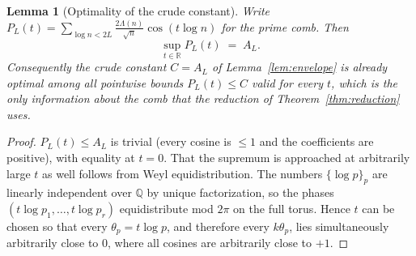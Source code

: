 ﻿\documentclass[11pt]{article}
\newtheorem{lemma}[theorem]{Lemma}
\newcommand{\R}{\mathbb{R}}
\begin{document}
\begin{lemma}[Optimality of the crude constant]\label{lem:sharp}
Write $P_L(t)=\sum_{\log n<2L}\frac{2\Lambda(n)}{\sqrt n}\cos(t\log n)$
for the prime comb.  Then
\[
\sup_{t\in\R}P_L(t)\;=\;A_L .
\]
Consequently the crude constant $C=A_L$ of Lemma~\ref{lem:envelope} is
already optimal among all pointwise bounds $P_L(t)\le C$ valid for
every $t$, which is the only information about the comb that the
reduction of Theorem~\ref{thm:reduction} uses.
\end{lemma}

\begin{proof}
$P_L(t)\le A_L$ is trivial (every cosine is $\le1$ and the
coefficients are positive), with equality at $t=0$.  That the supremum
is approached at arbitrarily large $t$ as well follows from Weyl
equidistribution.  The numbers $\{\log p\}_p$ are linearly independent
over $\mathbb Q$ by unique factorization, so the phases
$(t\log p_1,\dots,t\log p_r)$ equidistribute mod $2\pi$ on the full
torus.  Hence $t$ can be chosen so that every $\theta_p=t\log p$, and
therefore every $k\theta_p$, lies simultaneously arbitrarily close to
$0$, where all cosines are arbitrarily close to $+1$.
\end{proof}
\end{document}
